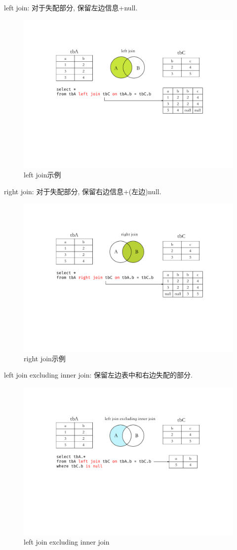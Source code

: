 left join: 对于失配部分, 保留左边信息+null.

\begin{figure}[H]
    \centering
    \includegraphics[width=.55\textwidth]{figure/left_join.pdf}
    \caption{left join示例}
\end{figure}

right join: 对于失配部分, 保留右边信息+(左边)null.

\begin{figure}[H]
    \centering
    \includegraphics[width=.55\textwidth]{figure/right_join.pdf}
    \caption{right join示例}
\end{figure}

left join excluding inner join: 保留左边表中和右边失配的部分.

\begin{figure}[H]
    \centering
    \includegraphics[width=.55\textwidth]{figure/left_join_ex_inner_join.pdf}
    \caption{left join excluding inner join}
\end{figure}

